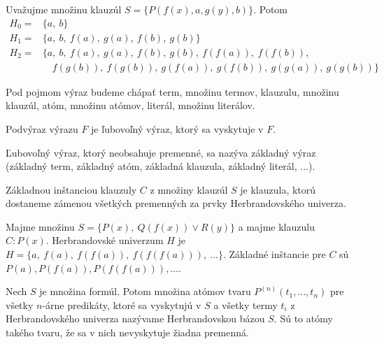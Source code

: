\begin{priklad}
    Uvažujme množinu klauzúl $S=\{P(f(x),a,g(y), b)\}$. Potom
    \begin{align*}
        H_0 =& \{ a,\ b\} \\
        H_1 =& \{ a,\ b,\ f(a),\ g(a),\ f(b),\ g(b) \} \\
        H_2 =& \{ a,\ b,\ f(a),\ g(a),\ f(b),\ g(b),\
                f(f(a)),\ f(f(b)),\\
              &\quad f(g(b)),\ f(g(b)),\
                g(f(a)),\ g(f(b)),\ g(g(a)),\ g(g(b)) \}
    \end{align*}    
\end{priklad}

\begin{definicia}[Výraz]
    Pod pojmom výraz budeme chápať 
    term, množinu termov,
    klauzulu, množinu klauzúl,
    atóm, množinu atómov,
    literál, množinu literálov.
\end{definicia}

\begin{definicia}[Podvýraz]
    Podvýraz výrazu $F$ je ľubovoľný výraz, ktorý sa vyskytuje v $F$.
\end{definicia}

\begin{definicia}
    Ľubovoľný výraz, ktorý neobsahuje premenné, sa nazýva základný výraz
    (základný term, základný atóm, základná klauzula, základný literál, ...).
\end{definicia}

\begin{definicia}
    Základnou inštanciou klauzuly $C$ z množiny klauzúl $S$ je klauzula,
    ktorú dostaneme zámenou všetkých premenných
    za prvky Herbrandovského univerza.
\end{definicia}

\begin{priklad}
    Majme množinu $S = \{P(x),\ Q(f(x)) \lor R(y) \}$ a majme klauzulu
    $C: P(x)$. 
    Herbrandovské univerzum $H$ je
    $H = \{ a,\ f(a),\ f(f(a)),\ f(f(f(a))),\ \dots \}$.
    Základné inštancie pre $C$ sú $P(a), P(f(a)), P(f(f(a))), \dots$.
\end{priklad}

\begin{definicia}
    Nech $S$ je množina formúl. Potom množina atómov
    tvaru $P^{(n)}(t_1, \ldots, t_n)$ pre všetky $n$-árne predikáty,
    ktoré sa vyskytujú v $S$ a všetky termy $t_i$ z Herbrandovského univerza
    nazývame Herbrandovskou bázou $S$.
    Sú to atómy takého tvaru, že sa v nich nevyskytuje žiadna
    premenná.
\end{definicia}

